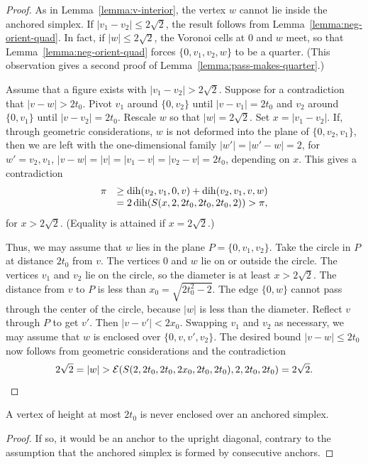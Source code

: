 \begin{proof}  As in Lemma~\ref{lemma:v-interior}, the vertex $w$ cannot lie inside the anchored
simplex.  If $|v_1-v_2|\le 2\sqrt{2}$, the result follows from
Lemma~\ref{lemma:neg-orient-quad}. In fact, if $|w|\le 2\sqrt{2}$,
the Voronoi cells at $0$ and $w$ meet, so that
Lemma~\ref{lemma:neg-orient-quad} forces $\{0,v_1,v_2,w\}$ to be a
quarter. (This observation gives a second proof of
Lemma~\ref{lemma:pass-makes-quarter}.)

Assume that a figure exists with $|v_1-v_2|>2\sqrt{2}$. Suppose for a
contradiction that $|v-w|>2t_0$.    Pivot $v_1$ around $\{0,v_2\}$ until
$|v-v_1|=2t_0$ and $v_2$ around $\{0,v_1\}$ until $|v-v_2|=2t_0$.  Rescale
$w$ so that $|w|=2\sqrt{2}$. Set $x = |v_1-v_2|$. If, through geometric
considerations, $w$ is not deformed into the plane of $\{0,v_2,v_1\}$,
then we are left with the one-dimensional family $|w'|=|w'-w|=2$, for
$w'=v_2,v_1$, $|v-w|=|v|=|v_1-v|=|v_2-v|=2t_0$, depending on  $x$. This
gives a contradiction
    $$
    \begin{array}{lll}
        \pi &\ge \operatorname{dih}(v_2,v_1,0,v) + \operatorname{dih}(v_2,v_1,v,w)\\
        &= 2\operatorname{dih}(S(x,2,2t_0,2t_0,2t_0,2))
         > \pi,
    \end{array}
    $$
for $x>2\sqrt{2}$.
(Equality is attained if $x=2\sqrt{2}$.)

Thus, we may assume that $w$ lies in the plane $P=\{0,v_1,v_2\}$. Take the
circle in $P$ at distance $2t_0$ from $v$. The vertices $0$ and $w$ lie
on or outside the circle. The vertices $v_1$ and $v_2$ lie on the
circle, so the diameter is at least $x>2\sqrt{2}$.  The distance from
$v$ to $P$ is less than $x_0= \sqrt{2t_0^2-2}$.  The edge $\{0,w\}$ cannot
pass through the center of the circle, because $|w|$ is less than the
diameter.
%
Reflect $v$ through $P$ to get $v'$.  Then $|v-v'|< 2x_0$. Swapping
$v_1$ and $v_2$ as necessary, we may assume that $w$ is enclosed over
$\{0,v,v',v_2\}$.  The desired bound $|v-w|\le 2t_0$ now follows from
geometric considerations and the contradiction
    $$
    2\sqrt{2}= |w| > {{\mathcal E}}(S(2,2t_0,2t_0,2x_0,2t_0,2t_0),2,2t_0,
        2t_0)= 2\sqrt{2}.
    $$
\end{proof}

\begin{corollary}
A vertex of height at most $2t_0$ is never enclosed over an anchored
simplex.
\end{corollary}

\begin{proof}  If so, it would be an anchor to the upright diagonal, contrary to
the assumption that the anchored simplex is formed by consecutive
anchors.
\end{proof}


